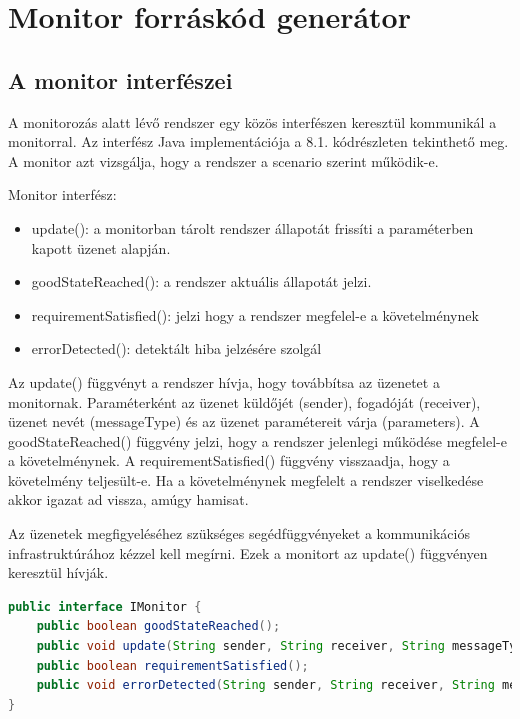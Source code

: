 \chapter{Monitor forráskód generátor}

\section{A monitor interfészei}

A monitorozás alatt lévő rendszer egy közös interfészen keresztül kommunikál a monitorral.
Az interfész Java implementációja a 8.1. kódrészleten tekinthető meg.
A monitor azt vizsgálja, hogy a rendszer a scenario szerint működik-e.

Monitor interfész:
\begin{itemize}
    \item update(): a monitorban tárolt rendszer állapotát frissíti a paraméterben kapott üzenet alapján.
    \item goodStateReached(): a rendszer aktuális állapotát jelzi.
    \item requirementSatisfied(): jelzi hogy a rendszer megfelel-e a követelménynek
    \item errorDetected(): detektált hiba jelzésére szolgál
\end{itemize}

Az update() függvényt a rendszer hívja, hogy továbbítsa az üzenetet a monitornak.
Paraméterként az üzenet küldőjét (sender), fogadóját (receiver), üzenet nevét (messageType) és az üzenet paramétereit várja (parameters).
A goodStateReached() függvény jelzi, hogy a rendszer jelenlegi működése megfelel-e a követelménynek.
A requirementSatisfied() függvény visszaadja, hogy a követelmény teljesült-e.
Ha a követelménynek megfelelt a rendszer viselkedése akkor igazat ad vissza, amúgy hamisat.

Az üzenetek megfigyeléséhez szükséges segédfüggvényeket a kommunikációs infrastruktúrához kézzel kell megírni.
Ezek a monitort az update() függvényen keresztül hívják.

\begin{lstlisting}[language=java,frame=single, float=h!, caption={Monitor interfész Java implementációja.},captionpos=b]
public interface IMonitor {
	public boolean goodStateReached();
	public void update(String sender, String receiver, String messageType, String[] parameters);
	public boolean requirementSatisfied();
	public void errorDetected(String sender, String receiver, String messageType, String[] parameters);
}
\end{lstlisting}

